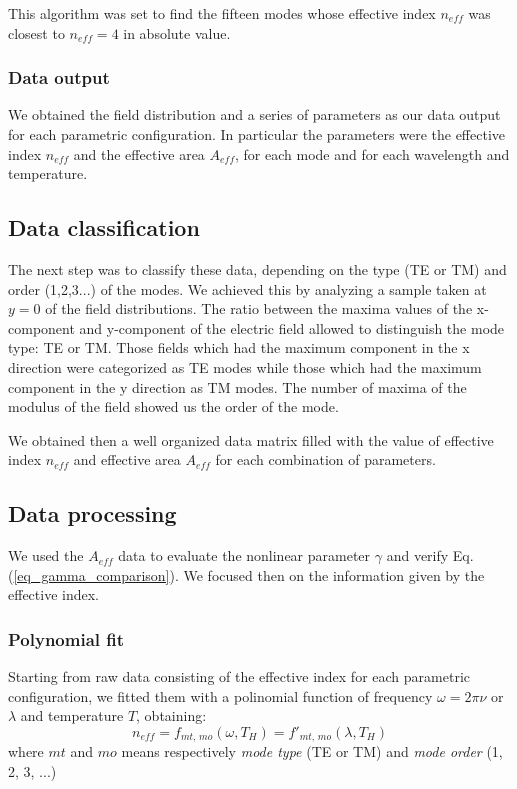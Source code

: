 \documentclass[12pt,a4paper,twoside]{article}
\begin{document}
This algorithm was set to find the fifteen modes whose effective index $n_{eff}$ was closest to $n_{eff}=4$ in absolute value.
\subsubsection{Data output}
We obtained the field distribution and a series of parameters as our data output for each parametric configuration.
In particular the parameters were the effective index $n_{eff}$ and the effective area $A_{eff}$, for each mode and for each wavelength and temperature.

\subsection{Data classification}
The next step was to classify these data, depending on the type (TE or TM) and order (1,2,3...) of the modes.
We achieved this by analyzing a sample taken at $y=0$ of the field distributions.
The ratio between the maxima values of the x-component and y-component of the electric field allowed to distinguish the mode type: TE or TM.
Those fields which had the maximum component in the x direction were categorized as TE modes while those which had the maximum component in the y direction as TM modes.
The number of maxima of the modulus of the field showed us the order of the mode.

We obtained then a well organized data matrix filled with the value of effective index $n_{eff}$ and effective area $A_{eff}$ for each combination of parameters.

\subsection{Data processing}
We used the $A_{eff}$ data to evaluate the nonlinear parameter $\gamma$ and verify Eq. (\ref{eq_gamma_comparison}).
We focused then on the information given by the effective index.

\subsubsection{Polynomial fit}
Starting from raw data consisting of the effective index for each parametric configuration, we fitted them with a polinomial function of frequency $\omega = 2\pi \nu$ or $\lambda$ and temperature $T$, obtaining:
$$n_{eff} = f_{mt,\,mo} \left( \omega, T_H \right) = f'_{mt,\,mo} \left( \lambda, T_H \right)$$
where $mt$ and $mo$ means respectively \textit{mode type} (TE or TM) and \textit{mode order} (1, 2, 3, ...)
\end{document}
